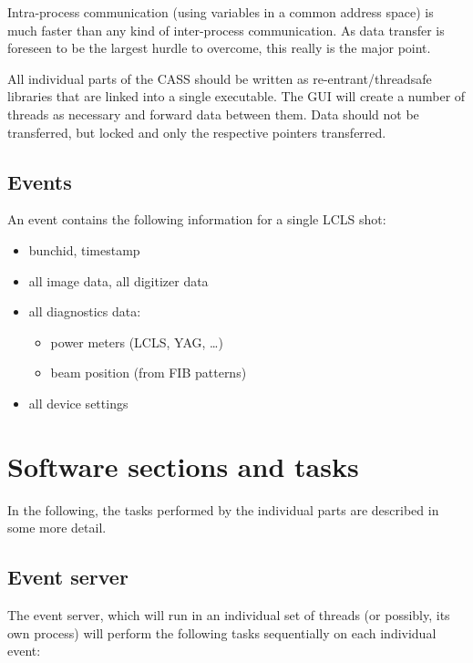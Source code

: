 \documentclass[11pt,a4paper,twoside]{article}
\begin{document}
Intra-process communication (using variables in a common address space) is much faster than any kind
of inter-process communication. As data transfer is foreseen to be the largest hurdle to overcome,
this really is the major point.

All individual parts of the CASS should be written as re-entrant/threadsafe libraries that are
linked into a single executable. The GUI will create a number of threads as necessary and forward
data between them. Data should not be transferred, but locked and only the respective pointers
transferred.

\subsection{Events}
\label{sec:events}

An event contains the following information for a single LCLS shot:

\begin{itemize}
\item bunchid, timestamp
\item all image data, all digitizer data
\item all diagnostics data:
   \begin{itemize}
   \item power meters (LCLS, YAG, \dots )
   \item beam position (from FIB patterns)
   \end{itemize}
\item all device settings
\end{itemize}


\section{Software sections and tasks}
\label{sec:software-sections-tasks}

In the following, the tasks performed by the individual parts are described in some more detail.


\subsection{Event server}
\label{sec:event-server}

The event server, which will run in an individual set of threads (or possibly, its own process) will
perform the following tasks sequentially on each individual event:
\end{document}
